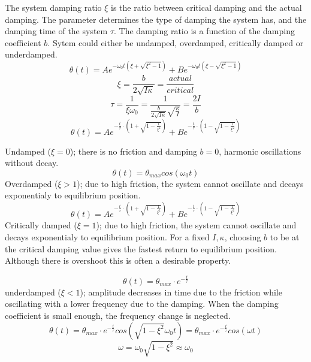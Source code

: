 \documentclass[\main/master.tex]{subfiles}
\begin{document}
The system damping ratio $\xi$ is the ratio between critical damping and the actual damping. The parameter determines the type of damping the system has, and the damping time of the system $\tau$. The damping ratio is a function of the damping coefficient $b$. Sytem could either be undamped, overdamped, critically damped or underdamped.
\begin{equation}
\theta(t) = Ae^{-\omega_0 t(\xi+\sqrt{\xi^2-1})} + Be^{-\omega_0 t(\xi-\sqrt{\xi^2-1})}    \label{eqn:damped_motion_equation}
\end{equation} 
\begin{equation}
\xi = \frac{b}{2\sqrt{I\kappa}} = \frac{actual}{critical}  \label{eqn:damped_motion_equation}
\end{equation}
\begin{equation}
\tau = \frac{1}{\xi\omega_0} = \frac{1}{\frac{b}{2\sqrt{I\kappa}}\sqrt{\frac{\kappa}{I}} }= \frac{2I}{b}  \label{eqn:damping_time}
\end{equation}
\begin{equation}
\theta(t) = Ae^{-\frac{t}{\tau}\cdot(1+\sqrt{1-\frac{1}{\xi^2}})} + Be^{-\frac{t}{\tau}\cdot(1-\sqrt{1-\frac{1}{\xi^2}})}    \label{eqn:damped_motion_equation}
\end{equation}




Undamped ($\xi = 0$); there is no friction and damping $b = 0$, harmonic oscillations without decay.
\begin{equation}
\theta(t) = \theta_{max}cos(\omega_0 t )    \label{eqn:undamped_motion_equation}
\end{equation}
Overdamped ($\xi > 1$); due to high friction, the system cannot oscillate and decays exponentialy to equilibrium position.
\begin{equation}
\theta(t) = Ae^{-\frac{t}{\tau}\cdot(1+\sqrt{1-\frac{1}{\xi^2}})} + Be^{-\frac{t}{\tau}\cdot(1-\sqrt{1-\frac{1}{\xi^2}})}    \label{eqn:overdamped_motion_equation}
\end{equation}
Critically damped ($\xi = 1$); due to high friction, the system cannot oscillate and decays exponentialy to equilibrium position. For a fixed $I, \kappa$, choosing $b$ to be at the critical damping value gives
the fastest return to equilibrium position. Although there is overshoot this is often a desirable property.

\begin{equation}
\theta(t) = \theta_{max}\cdot e^{-\frac{t}{\tau}}     \label{eqn:underdamped_motion_equation}
\end{equation}
 underdamped ($\xi < 1$); amplitude decreases in time due to the friction while oscillating with a lower frequency due to the damping. When the damping coefficient is small enough, the frequency change is neglected.
\begin{equation}
\theta(t) = \theta_{max}\cdot e^{-\frac{t}{\tau}}cos(\sqrt{1-\xi^2}\omega_0 t ) =  \theta_{max}\cdot e^{-\frac{t}{\tau}}cos(\omega t )    \label{eqn:underdamped_motion_equation}
\end{equation}
\begin{equation}
\omega = \omega_0\sqrt{1-\xi^2}\approx\omega_0    \label{eqn:underdamped_frequency}
\end{equation}
\end{document}
